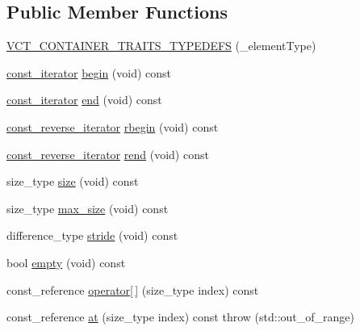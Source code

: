 \subsection*{Public Member Functions}
\begin{DoxyCompactItemize}
\item 
\hyperlink{classvct_fixed_size_const_vector_base_aa58a77c3e1e45a50d7677d9a8fbb5f17}{V\+C\+T\+\_\+\+C\+O\+N\+T\+A\+I\+N\+E\+R\+\_\+\+T\+R\+A\+I\+T\+S\+\_\+\+T\+Y\+P\+E\+D\+E\+F\+S} (\+\_\+element\+Type)
\item 
\hyperlink{classvct_fixed_size_const_vector_base_abc547e0542bb6f7d92876a56c7ea5cdc}{const\+\_\+iterator} \hyperlink{classvct_fixed_size_const_vector_base_a78e79d048c2a069fa331a10c7c497806}{begin} (void) const 
\item 
\hyperlink{classvct_fixed_size_const_vector_base_abc547e0542bb6f7d92876a56c7ea5cdc}{const\+\_\+iterator} \hyperlink{classvct_fixed_size_const_vector_base_a304e1ab5b8fc2627cf8544d1acc3ba36}{end} (void) const 
\item 
\hyperlink{classvct_fixed_size_const_vector_base_acd0a5fe64ff3551c45cebfb2ba81cf10}{const\+\_\+reverse\+\_\+iterator} \hyperlink{classvct_fixed_size_const_vector_base_a619ec380da3061d80e856f28fe2b2964}{rbegin} (void) const 
\item 
\hyperlink{classvct_fixed_size_const_vector_base_acd0a5fe64ff3551c45cebfb2ba81cf10}{const\+\_\+reverse\+\_\+iterator} \hyperlink{classvct_fixed_size_const_vector_base_acd691bb22ac1ca5abf578be37273fb5d}{rend} (void) const 
\item 
size\+\_\+type \hyperlink{classvct_fixed_size_const_vector_base_a05beb10f53809905f4db11b0b5b6f651}{size} (void) const 
\item 
size\+\_\+type \hyperlink{classvct_fixed_size_const_vector_base_a50473c70f34bcab8e01ba2eaeef69813}{max\+\_\+size} (void) const 
\item 
difference\+\_\+type \hyperlink{classvct_fixed_size_const_vector_base_ac1cbc7509e0cc11b011acc63f2584331}{stride} (void) const 
\item 
bool \hyperlink{classvct_fixed_size_const_vector_base_aed78a0e4e2c5119bfb92d53bedb572e2}{empty} (void) const 
\item 
const\+\_\+reference \hyperlink{classvct_fixed_size_const_vector_base_a54c324bad074d2c2ca7bfadcda0eba3d}{operator\mbox{[}$\,$\mbox{]}} (size\+\_\+type index) const 
\item 
const\+\_\+reference \hyperlink{classvct_fixed_size_const_vector_base_ae5a13bd07071fd5338c87d13ba385b33}{at} (size\+\_\+type index) const   throw (std\+::out\+\_\+of\+\_\+range)

\end{DoxyCompactItemize}
